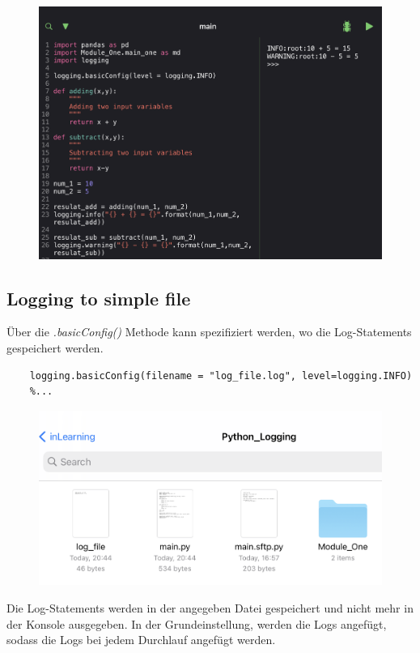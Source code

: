 \begin{figure}[H]
	\centering
	\includegraphics[scale = 0.5]{attachment/chapter_4/Scc026}
\end{figure}

\subsection{Logging to simple file}
Über die \textit{.basicConfig()} Methode kann spezifiziert werden, wo die Log-Statements gespeichert werden.

\begin{lstlisting}[style=python]
	%...
	logging.basicConfig(filename = "log_file.log", level=logging.INFO)
	%...
\end{lstlisting}

\begin{figure}[H]
	\centering
	\includegraphics[scale = 0.5]{attachment/chapter_4/Scc027}
\end{figure}
Die Log-Statements werden in der angegeben Datei gespeichert und nicht mehr in der Konsole ausgegeben. In der Grundeinstellung, werden die Logs angefügt, sodass die Logs bei jedem Durchlauf angefügt werden.

